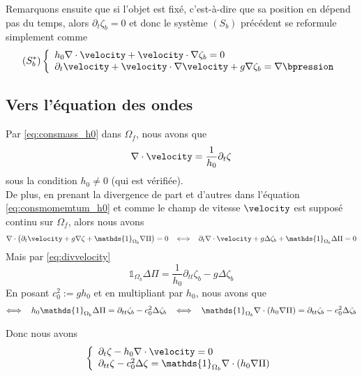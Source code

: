 \noindent Remarquons ensuite que si l'objet est fixé, c'est-à-dire que sa position en dépend pas du temps, alors $\partial_t \zeta_b = 0$ et donc le système $(S_b)$ précédent se reformule simplement comme
\begin{equation}
	(S^*_b)\left\{\begin{array}{l}
	 h_0 \nabla \cdot\velocity + \velocity \cdot \nabla \zeta_b = 0\\
	\partial_t\velocity + \velocity\cdot \nabla\velocity + g \nabla\zeta_b = \nabla\bpression
	\end{array}\right.
\end{equation}














\vspace*{6cm}
\subsection{Vers l'équation des ondes}
\noindent Par \eqref{eq:consmass_h0} dans $\Omega_f$, nous avons que
\begin{equation}
	\nabla\cdot \velocity = \frac{1}{h_0}\partial_t\zeta\label{eq:divvelocity}
\end{equation}
sous la condition $h_0\neq 0$ (qui est vérifiée).\\
De plus, en prenant la divergence de part et d'autres dans l'équation \eqref{eq:consmomemtum_h0} et comme le champ de vitesse $\velocity$ est supposé continu sur $\Omega_f$, alors nous avons
\begin{equation*}
	\nabla\cdot\left(\partial_t \velocity + g\nabla\zeta + \mathds{1}_{\Omega_b}\nabla \Pi\right) = 0\hspace{3mm}
	\Longleftrightarrow\hspace{3mm} \partial_t \nabla\cdot\velocity + g\Delta\zeta_b + \mathds{1}_{\Omega_b}\Delta \Pi = 0
\end{equation*}
Mais par \eqref{eq:divvelocity}
\begin{equation}
	\mathds{1}_{\Omega_b}\Delta \Pi = \frac{1}{h_0}\partial_{tt}\zeta_b - g\Delta\zeta_b
\end{equation}
En posant $c_0^2 := gh_0$ et en multipliant par $h_0$, nous avons que
\begin{equation}
	\Longleftrightarrow\hspace{3mm} h_0\mathds{1}_{\Omega_b}\Delta \Pi =\partial_{tt}\zeta_b - c_0^2\Delta\zeta_b\hspace{3mm} \Longleftrightarrow\hspace{3mm} \mathds{1}_{\Omega_b}\nabla \cdot \left(h_0\nabla\Pi\right) = \partial_{tt}\zeta_b - c_0^2\Delta\zeta_b
\end{equation}

\noindent Donc nous avons
\begin{equation}
	\left\{
	\begin{array}{l}
	\partial_t\zeta - h_0\nabla\cdot\velocity = 0\\
	\partial_{tt}\zeta - c_0^2\Delta\zeta = \mathds{1}_{\Omega_b} \nabla \cdot \left(h_0\nabla \Pi\right)
	\end{array}
	\right.
\end{equation}

\citet[chap 2]{toro_riemann_2009}